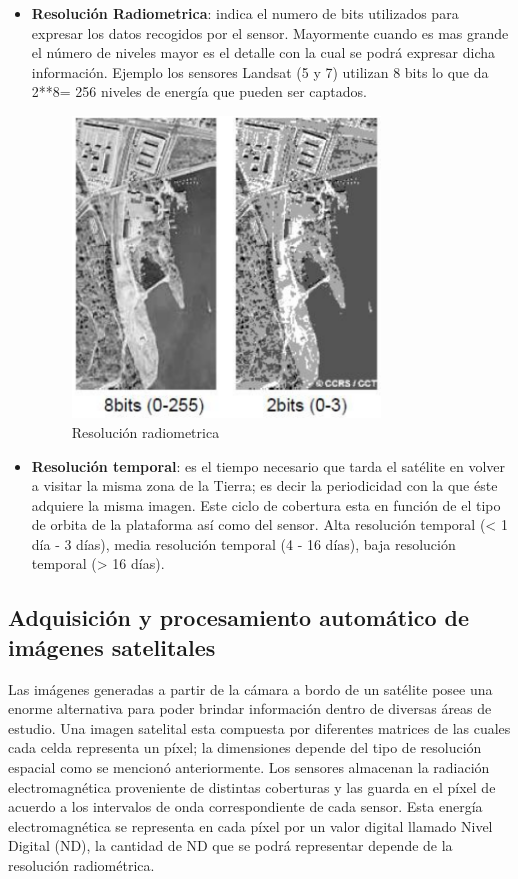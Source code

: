 \begin{itemize}
\item \textbf{Resolución Radiometrica}: indica el numero de bits utilizados para expresar los datos recogidos por el sensor. Mayormente cuando es mas grande el número de niveles mayor es el detalle con la cual se podrá expresar dicha información. Ejemplo los sensores Landsat (5 y 7) utilizan 8 bits lo que da 2**8= 256 niveles de energía que pueden ser captados.
\begin{figure}[H] \centering
  \includegraphics[height=8cm,keepaspectratio=true,clip=true]{imagenes/MarcoTeorico/resolucion_radiometrica.png}
  \caption{Resolución radiometrica}\label{Fig:resolucion-radiometrica}
\end{figure}

\item \textbf{Resolución temporal}: es el tiempo necesario que tarda el satélite en volver a visitar la misma zona de la Tierra; es decir la periodicidad con la que éste adquiere la misma imagen. Este ciclo de cobertura esta en función de el tipo de orbita de la plataforma así como del sensor. Alta resolución temporal (< 1 día - 3 días), media resolución temporal (4 - 16 días), baja resolución temporal (> 16 días).

\end{itemize}

\subsection{Adquisición y procesamiento automático de imágenes satelitales}\label{sub:imagen_satelital}

Las imágenes generadas a partir de la cámara a bordo de un satélite posee una enorme alternativa para poder brindar información dentro de diversas áreas de estudio. Una imagen satelital esta compuesta por diferentes matrices de las cuales cada celda representa un píxel; la dimensiones  depende del tipo de resolución espacial como se mencionó anteriormente. Los sensores almacenan la radiación electromagnética proveniente de distintas coberturas y las guarda en el píxel de acuerdo a los intervalos de onda correspondiente de cada sensor. Esta energía electromagnética se representa en cada píxel por un valor digital llamado Nivel Digital (ND), la cantidad de ND que se podrá representar depende de la resolución radiométrica.

